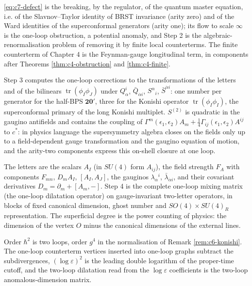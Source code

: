 \begin{remark}
\eqref{eq:c7-defect} is the breaking, by the regulator, of the quantum master equation, i.e. of the Slavnov--Taylor identity of BRST invariance (arity zero) and of the Ward identities of the superconformal generators (arity one); its flow to scale $\infty$ is the one-loop obstruction, a potential anomaly, and Step 2 is the algebraic-renormalisation problem of removing it by finite local counterterms. The finite counterterm of Chapter 4 is the Feynman-gauge longitudinal term, in components after Theorems \ref{thm:c4-obstruction} and \ref{thm:c4-finite}.
\end{remark}

\begin{remark}
Step 3 computes the one-loop corrections to the transformations of the letters and of the bilinears $\operatorname{tr}(\phi_I\phi_J)$ under $Q^i_\alpha$, $\bar Q_{\dot\alpha i}$, $S^\alpha{}_i$, $\bar S^{\dot\alpha i}$: one number per generator for the half-BPS $\mathbf{20'}$, three for the Konishi operator $\operatorname{tr}(\phi_I\phi_I)$, the superconformal primary of the long Konishi multiplet. $S^{(2)}$ is quadratic in the gaugino antifields and contains the coupling of $\Gamma^m(\epsilon_1,\epsilon_2)A_m+\tfrac14\Gamma_{ij}(\epsilon_1,\epsilon_2)A^{ij}$ to $c^*$: in physics language the supersymmetry algebra closes on the fields only up to a field-dependent gauge transformation and the gaugino equation of motion, and the arity-two components express this on-shell closure at one loop.
\end{remark}

\begin{remark}
The letters are the scalars $A_I$ (in $SU(4)$ form $A_{ij}$), the field strength $F_A$ with components $F_{mn}$, $D_mA_I$, $[A_I,A_J]$, the gauginos $\lambda_\alpha{}^i$, $\bar\lambda_{\dot\alpha i}$, and their covariant derivatives $D_m=\partial_m+[A_m,-]$. Step 4 is the complete one-loop mixing matrix (the one-loop dilatation operator) on gauge-invariant two-letter operators, in blocks of fixed canonical dimension, ghost number and $SO(4)\times SU(4)_R$ representation. The superficial degree is the power counting of physics: the dimension of the vertex $O$ minus the canonical dimensions of the external lines.
\end{remark}

\begin{remark}
Order $\hbar^2$ is two loops, order $g^4$ in the normalisation of Remark \ref{rem:c6-konishi}. The one-loop counterterm vertices inserted into one-loop graphs subtract the subdivergences, $(\log\varepsilon)^2$ is the leading double logarithm of the proper-time cutoff, and the two-loop dilatation read from the $\log\varepsilon$ coefficients is the two-loop anomalous-dimension matrix.
\end{remark}
